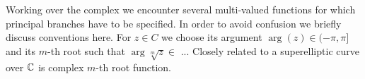 \documentclass[main.tex]{subfiles}
\begin{document}
  
%    
% 
%   
  Working over the complex we encounter several multi-valued functions for which principal branches have to be specified. In order to avoid confusion we briefly discuss conventions here. 
  For $z \in C$ we choose its argument $\arg(z) \in (-\pi,\pi]$ and its $m$-th root such that $\arg \sqrt[m]{z} \in$ ...
  Closely related to a superelliptic curve over $\mathbb{C}$ is complex $m$-th root function.
  
\end{document}
